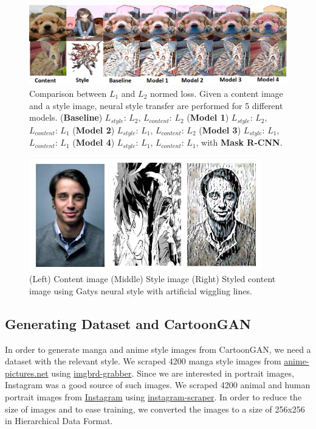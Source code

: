 \documentclass{article}
\begin{document}
\begin{figure}[th]
  \centering
  \includegraphics[width=\textwidth]{figure/result_1.png}
  \caption{Comparison between $L_1$ and $L_2$ normed loss. Given a content image and a style image, neural style transfer are performed for 5 different models. (\textbf{Baseline}) $L_{style}$: $L_2$, $L_{content}$: $L_2$ (\textbf{Model 1}) $L_{style}$: $L_2$, $L_{content}$: $L_1$ (\textbf{Model 2}) $L_{style}$: $L_1$, $L_{content}$: $L_2$ (\textbf{Model 3}) $L_{style}$: $L_1$, $L_{content}$: $L_1$ (\textbf{Model 4}) $L_{style}$: $L_1$, $L_{content}$: $L_1$, with \textbf{Mask R-CNN}.}
  \label{fig:result_1}
\end{figure}

\begin{figure}[th!]
  \centering
  \includegraphics[width=0.9\textwidth, height=0.15\textheight]{figure/base_line.png}
  \caption{(Left) Content image (Middle) Style image (Right) Styled content image using Gatys neural style with artificial wiggling lines.}
  \label{fig:wiggle}
\end{figure}


\subsection{Generating Dataset and CartoonGAN}
In order to generate manga and anime style images from CartoonGAN, we need a dataset with the relevant style. We scraped 4200 manga style images from \href{https:\\anime-pictures.net}{anime-pictures.net} using \href{https://bionus.github.io/imgbrd-grabber/}{imgbrd-grabber}. Since we are interested in portrait images, Instagram was a good source of such images. We scraped 4200 animal and human portrait images from \href{https://instagram.com}{Instagram} using \href{https://bionus.github.io/imgbrd-grabber/}{instagram-scraper}. In order to reduce the size of images and to ease training, we converted the images to a size of 256x256 in Hierarchical Data Format.
\end{document}
